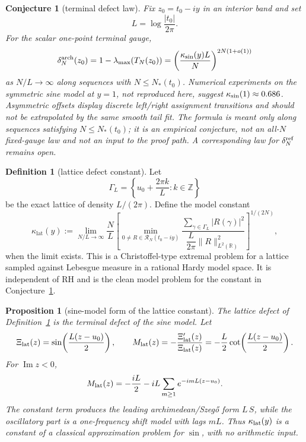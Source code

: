 \documentclass[11pt]{amsart}
\newtheorem{proposition}[theorem]{Proposition}
\newtheorem{conjecture}[theorem]{Conjecture}
\theoremstyle{definition}
\newtheorem{definition}[theorem]{Definition}
\theoremstyle{remark}
\theoremstyle{definition}
\renewcommand{\Im}{\operatorname{Im}}
\newcommand{\R}{\mathbb{R}}
\newcommand{\Z}{\mathbb{Z}}
\begin{document}
\begin{conjecture}[terminal defect law]\label{conj:defect-law}
Fix $z_0=t_0-iy$ in an interior band and set
\[
   L=\log\frac{|t_0|}{2\pi}.
\]
For the scalar one-point terminal gauge,
\[
   \delta_N^{\rm arch}(z_0)=1-\lambda_{\max}(T_N(z_0))
   =
   \left(\frac{\kappa_{\rm sin}(y)L}{N}\right)^{2N(1+o(1))}
\]
as $N/L\to\infty$ along sequences with $N\le N_*(t_0)$.
Numerical experiments on the symmetric sine model at $y=1$, not reproduced here, suggest
$\kappa_{\rm sin}(1)\approx0.686$.  Asymmetric offsets display discrete left/right assignment transitions and should not be extrapolated by
the same smooth tail fit.  The formula is meant only along sequences satisfying
$N\le N_*(t_0)$; it is an empirical conjecture, not an all-$N$ fixed-gauge law and not an input to the
proof path.  A corresponding law for $\delta_N^{\rm ref}$ remains open.
\end{conjecture}

\begin{definition}[lattice defect constant]\label{def:kappa-lattice}
Let
\[
   \Gamma_L=\left\{u_0+\frac{2\pi k}{L}:k\in\Z\right\}
\]
be the exact lattice of density $L/(2\pi)$.  Define the model constant
\[
   \kappa_{\mathrm{lat}}(y):=
   \lim_{N/L\to\infty}
   \frac NL
   \left[
      \min_{0\ne R\in\mathcal R_N(t_0-iy)}
      \frac{\sum_{\gamma\in\Gamma_L}|R(\gamma)|^2}
           {\dfrac L{2\pi}\|R\|_{L^2(\R)}^2}
   \right]^{1/(2N)},
\]
when the limit exists.  This is a Christoffel-type extremal problem for a lattice sampled against
Lebesgue measure in a rational Hardy model space.  It is independent of RH and is the clean model
problem for the constant in Conjecture~\ref{conj:defect-law}.
\end{definition}

\begin{proposition}[sine-model form of the lattice constant]\label{prop:sine-model}
The lattice defect of Definition~\ref{def:kappa-lattice} is the terminal defect of the sine model.  Let
\[
   \Xi_{\rm lat}(z)=\sin\!\left(\frac{L(z-u_0)}2\right),
   \qquad
   M_{\rm lat}(z)=-\frac{\Xi_{\rm lat}'(z)}{\Xi_{\rm lat}(z)}
   =-\frac L2\cot\!\left(\frac{L(z-u_0)}2\right).
\]
For $\Im z<0$,
\[
   M_{\rm lat}(z)
   =
   -\frac{iL}{2}
   -iL\sum_{m\ge1}e^{-imL(z-u_0)}.
\]
The constant term produces the leading archimedean/Szeg\H{o} form $L\,S$, while the oscillatory part
is a one-frequency shift model with lags $mL$.  Thus $\kappa_{\rm lat}(y)$ is a constant of a classical
approximation problem for $\sin$, with no arithmetic input.
\end{proposition}
\end{document}
